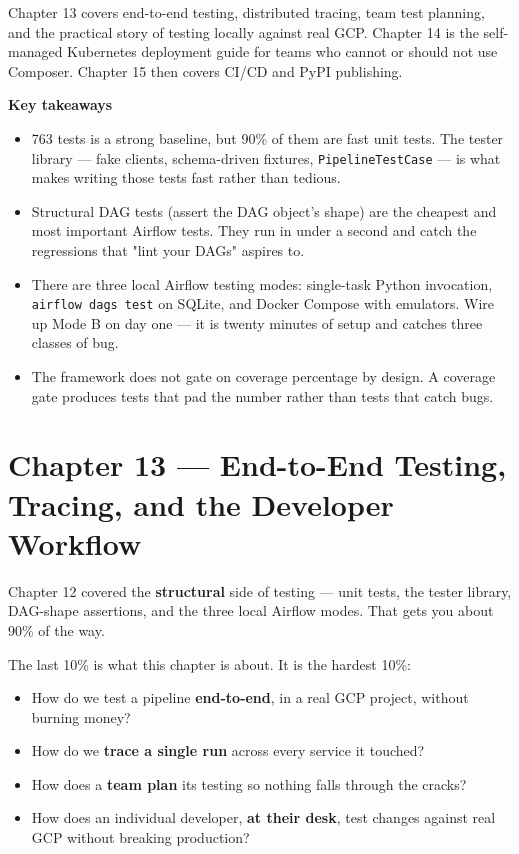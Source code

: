 \documentclass[
  11pt,
  british,
  oneside]{book}
\providecommand{\tightlist}{%
  \setlength{\itemsep}{0pt}\setlength{\parskip}{0pt}}
\begin{document}
Chapter 13 covers end-to-end testing, distributed tracing, team test
planning, and the practical story of testing locally against real GCP.
Chapter 14 is the self-managed Kubernetes deployment guide for teams who
cannot or should not use Composer. Chapter 15 then covers CI/CD and PyPI
publishing.

\begin{takeaways}
\textbf{Key takeaways}
\begin{itemize}
  \item 763 tests is a strong baseline, but 90\% of them are fast unit tests. The tester library — fake clients, schema-driven fixtures, \texttt{PipelineTestCase} — is what makes writing those tests fast rather than tedious.
  \item Structural DAG tests (assert the DAG object's shape) are the cheapest and most important Airflow tests. They run in under a second and catch the regressions that "lint your DAGs" aspires to.
  \item There are three local Airflow testing modes: single-task Python invocation, \texttt{airflow dags test} on SQLite, and Docker Compose with emulators. Wire up Mode B on day one — it is twenty minutes of setup and catches three classes of bug.
  \item The framework does not gate on coverage percentage by design. A coverage gate produces tests that pad the number rather than tests that catch bugs.
\end{itemize}
\end{takeaways}

\newpage

\hypertarget{chapter-13-end-to-end-testing-tracing-and-the-developer-workflow}{%
\chapter{Chapter 13 --- End-to-End Testing, Tracing, and the Developer
Workflow}\label{chapter-13-end-to-end-testing-tracing-and-the-developer-workflow}}

Chapter 12 covered the \textbf{structural} side of testing --- unit
tests, the tester library, DAG-shape assertions, and the three local
Airflow modes. That gets you about 90\% of the way.

The last 10\% is what this chapter is about. It is the hardest 10\%:

\begin{itemize}
\tightlist
\item
  How do we test a pipeline \textbf{end-to-end}, in a real GCP project,
  without burning money?
\item
  How do we \textbf{trace a single run} across every service it touched?
\item
  How does a \textbf{team plan} its testing so nothing falls through the
  cracks?
\item
  How does an individual developer, \textbf{at their desk}, test changes
  against real GCP without breaking production?
\end{itemize}
\end{document}
